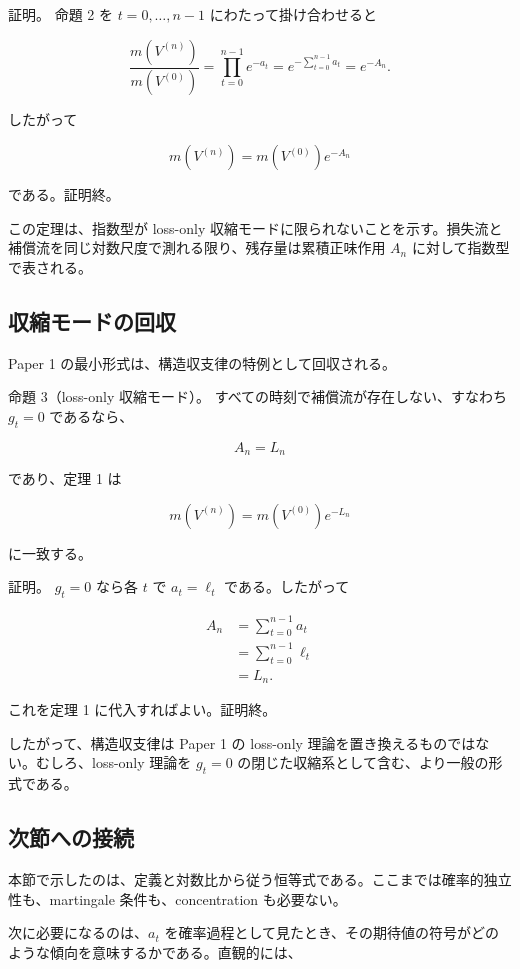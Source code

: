 \documentclass[12pt,a4paper]{article}
\begin{document}
証明。 命題 2 を \(t=0,\ldots,n-1\) にわたって掛け合わせると

\[
\frac{m(V^{(n)})}{m(V^{(0)})} = \prod_{t=0}^{n-1} e^{-a_{t}} = e^{-\sum_{t=0}^{n-1} a_{t}} = e^{-A_{n}}.
\]

したがって

\[
m(V^{(n)}) = m(V^{(0)}) e^{-A_{n}}
\]

である。証明終。

この定理は、指数型が loss-only 収縮モードに限られないことを示す。損失流と補償流を同じ対数尺度で測れる限り、残存量は累積正味作用 \(A_{n}\) に対して指数型で表される。

\subsection{収縮モードの回収}\label{ux53ceux7e2eux30e2ux30fcux30c9ux306eux56deux53ce}

Paper 1 の最小形式は、構造収支律の特例として回収される。

命題 3（loss-only 収縮モード）。 すべての時刻で補償流が存在しない、すなわち \(g_{t}=0\) であるなら、

\[
A_{n} = L_{n}
\]

であり、定理 1 は

\[
m(V^{(n)}) = m(V^{(0)}) e^{-L_{n}}
\]

に一致する。

証明。 \(g_{t}=0\) なら各 \(t\) で \(a_{t}=\ell_{t}\) である。したがって

\[
\begin{aligned}
A_{n} &= \sum_{t=0}^{n-1} a_{t} \\
&= \sum_{t=0}^{n-1} \ell_{t} \\
&= L_{n}.
\end{aligned}
\]

これを定理 1 に代入すればよい。証明終。

したがって、構造収支律は Paper 1 の loss-only 理論を置き換えるものではない。むしろ、loss-only 理論を \(g_{t}=0\) の閉じた収縮系として含む、より一般の形式である。

\subsection{次節への接続}\label{ux6b21ux7bc0ux3078ux306eux63a5ux7d9a}

本節で示したのは、定義と対数比から従う恒等式である。ここまでは確率的独立性も、martingale 条件も、concentration も必要ない。

次に必要になるのは、\(a_{t}\) を確率過程として見たとき、その期待値の符号がどのような傾向を意味するかである。直観的には、
\end{document}
